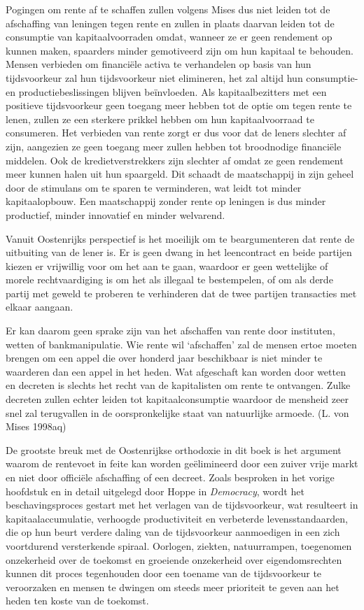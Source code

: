 \documentclass[
  a5paper,
  smalldemyvopaper,11pt,twoside,onecolumn,openright,extrafontsizes,
hidelinks]{memoir}
\begin{document}
Pogingen om rente af te schaffen zullen volgens Mises dus niet leiden
tot de afschaffing van leningen tegen rente en zullen in plaats daarvan
leiden tot de consumptie van kapitaalvoorraden omdat, wanneer ze er geen
rendement op kunnen maken, spaarders minder gemotiveerd zijn om hun
kapitaal te behouden. Mensen verbieden om financiële activa te
verhandelen op basis van hun tijdsvoorkeur zal hun tijdsvoorkeur niet
elimineren, het zal altijd hun consumptie- en productiebeslissingen
blijven beïnvloeden. Als kapitaalbezitters met een positieve
tijdsvoorkeur geen toegang meer hebben tot de optie om tegen rente te
lenen, zullen ze een sterkere prikkel hebben om hun kapitaalvoorraad te
consumeren. Het verbieden van rente zorgt er dus voor dat de leners
slechter af zijn, aangezien ze geen toegang meer zullen hebben tot
broodnodige financiële middelen. Ook de kredietverstrekkers zijn
slechter af omdat ze geen rendement meer kunnen halen uit hun spaargeld.
Dit schaadt de maatschappij in zijn geheel door de stimulans om te
sparen te verminderen, wat leidt tot minder kapitaalopbouw. Een
maatschappij zonder rente op leningen is dus minder productief, minder
innovatief en minder welvarend.

Vanuit Oostenrijks perspectief is het moeilijk om te beargumenteren dat
rente de uitbuiting van de lener is. Er is geen dwang in het
leencontract en beide partijen kiezen er vrijwillig voor om het aan te
gaan, waardoor er geen wettelijke of morele rechtvaardiging is om het
als illegaal te bestempelen, of om als derde partij met geweld te
proberen te verhinderen dat de twee partijen transacties met elkaar
aangaan.

Er kan daarom geen sprake zijn van het afschaffen van rente door
instituten, wetten of bankmanipulatie. Wie rente wil `afschaffen' zal de
mensen ertoe moeten brengen om een appel die over honderd jaar
beschikbaar is niet minder te waarderen dan een appel in het heden. Wat
afgeschaft kan worden door wetten en decreten is slechts het recht van
de kapitalisten om rente te ontvangen. Zulke decreten zullen echter
leiden tot kapitaalconsumptie waardoor de mensheid zeer snel zal
terugvallen in de oorspronkelijke staat van natuurlijke armoede. (L. von
Mises 1998aq)

De grootste breuk met de Oostenrijkse orthodoxie in dit boek is het
argument waarom de rentevoet in feite kan worden geëlimineerd door een
zuiver vrije markt en niet door officiële afschaffing of een decreet.
Zoals besproken in het vorige hoofdstuk en in detail uitgelegd door
Hoppe in \emph{Democracy}, wordt het beschavingsproces gestart met het
verlagen van de tijdsvoorkeur, wat resulteert in kapitaalaccumulatie,
verhoogde productiviteit en verbeterde levensstandaarden, die op hun
beurt verdere daling van de tijdsvoorkeur aanmoedigen in een zich
voortdurend versterkende spiraal. Oorlogen, ziekten, natuurrampen,
toegenomen onzekerheid over de toekomst en groeiende onzekerheid over
eigendomsrechten kunnen dit proces tegenhouden door een toename van de
tijdsvoorkeur te veroorzaken en mensen te dwingen om steeds meer
prioriteit te geven aan het heden ten koste van de toekomst.
\end{document}
